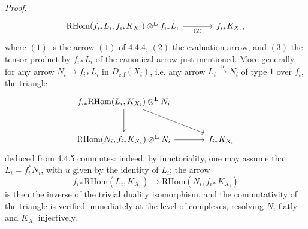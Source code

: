 \documentclass[11pt]{article}
\newenvironment{prooftext}[1][Proof]{\par\noindent\emph{#1.}\ }{\par\medskip}
\providecommand{\RHom}{\mathrm{RHom}}
\providecommand{\Dctf}{D_{\mathrm{ctf}}}
\providecommand{\Dctf}{D_{\mathrm{ctf}}}
\providecommand{\RHom}{\mathrm{RHom}}
\providecommand{\RHom}{\mathrm R\mathcal{H}om}
\providecommand{\RHom}{\mathrm{RHom}}
\begin{document}
\begin{prooftext}[Proof]
\begin{equation}
\begin{tikzcd}[column sep=large,row sep=large]
\RHom(f_{i*}L_i,f_{i*}K_{X_i})\otimes^{\mathbf L} f_{i*}L_i
 \arrow[r,"(2)"'] &
f_{i*}K_{X_i},
\end{tikzcd}
\end{equation}
where $(1)$ is the arrow $(1)$ of 4.4.4, $(2)$ the evaluation arrow, and $(3)$ the tensor product by $f_{i*}L_i$ of the canonical arrow just mentioned. More generally, for any arrow $N_i\longrightarrow f_{i*}L_i$ in $\Dctf(X_i)$, i.e. any arrow $L_i\xrightarrow{u}N_i$ of type $1$ over $f_i$, the triangle
\[
\begin{tikzcd}[column sep=large,row sep=large]
f_{i*}\RHom(L_i,K_{X_i})\otimes^{\mathbf L}N_i
 \arrow[dr] \arrow[d] & \\
\RHom(N_i,f_{i*}K_{X_i})\otimes^{\mathbf L}N_i \arrow[r] &
f_{i*}K_{X_i}
\end{tikzcd}
\]
deduced from 4.4.5 commutes: indeed, by functoriality, one may assume that $L_i=f_i^*N_i$, with $u$ given by the identity of $L_i$; the arrow
\[
f_{i*}\RHom(L_i,K_{X_i})\longrightarrow\RHom(N_i,f_{i*}K_{X_i})
\]
is then the inverse of the trivial duality isomorphism, and the commutativity of the triangle is verified immediately at the level of complexes, resolving $N_i$ flatly and $K_{X_i}$ injectively.


\end{prooftext}
\end{document}
